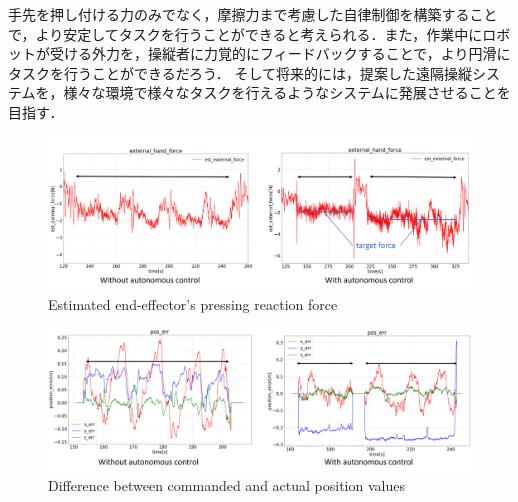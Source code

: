 \documentclass{jarticle}
\begin{document}
手先を押し付ける力のみでなく，摩擦力まで考慮した自律制御を構築することで，より安定してタスクを行うことができると考えられる．また，作業中にロボットが受ける外力を，操縦者に力覚的にフィードバックすることで，より円滑にタスクを行うことができるだろう．
そして将来的には，提案した遠隔操縦システムを，様々な環境で様々なタスクを行えるようなシステムに発展させることを目指す．

\begin{figure}[t]
    \centering
    \includegraphics[width=1.0\columnwidth]{figs/hand_force_compare}
    \caption{Estimated end-effector's pressing reaction force}
    \label{fig:hand_force_compare}
\end{figure}

\begin{figure}[t]
    \centering
    \includegraphics[width=1.0\columnwidth]{figs/pos_err_compare}
    \caption{Difference between commanded and actual position values}
    \label{fig:pos_err_compare}
\end{figure}

\footnotesize





\normalsize
\end{document}
